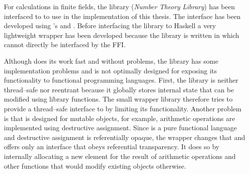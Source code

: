 \label{sec:finite-field-calcs}

For calculations in finite fields, the \JWTcpp{} library \JWTLntl{}
(\emph{Number Theory Library}) has been interfaced to \JWThaskell{} to use in
the implementation of this thesis. The interface has been developed using
\JWThaskell{}'s  \cite{haskell2010} and
 \cite{c2hs}.  Before interfacing the
library to Haskell a very lightweight \JWTc{} wrapper has been developed because
the library is written in \JWTcpp{} which cannot directly be interfaced by the
FFI.

Although \JWTntl{} does its work fast and without problems, the library has some
implementation problems and is not optimally designed for exposing its
functionality to functional programming languages. First, the library is
neither thread--safe nor reentrant because it globally stores internal state
that can be modified using library functions. The small \JWTc{} wrapper library
therefore tries to provide a thread--safe interface to \JWTntl{} by limiting its
functionality.  Another problem is that \JWTntl{} is designed for mutable
objects, for example, arithmetic operations are implemented using destructive
assignment.  Since \JWThaskell{} is a pure functional language
\cite{haskell2010} and destructive assignment is referentially opaque, the
\JWTc{} wrapper changes that and offers only an interface that obeys referential
transparency. It does so by internally allocating a new element for the result
of arithmetic operations and other functions that would modify existing objects
otherwise.


